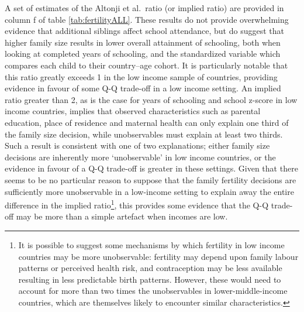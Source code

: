 \documentclass{article}[11pt,subeqn]
\begin{document}
\begin{spacing}{1.5}
A set of estimates of the Altonji et al.\ ratio (or implied ratio) are provided in column f of table \ref{tab:fertilityALL}.  These results do not provide overwhelming evidence
that additional siblings affect school attendance, but do suggest that higher family size results in lower overall attainment of schooling, both when looking at completed years 
of schooling, and the standardized variable which compares each child to their country--age cohort.  It is particularly notable that this ratio greatly exceeds 1 in the low
 income sample of countries, providing evidence in favour of some Q-Q trade-off in a low income setting.  An implied ratio greater than 2, as is the case for years of schooling 
and school z-score in low income countries, implies that observed characteristics such as parental education, place of residence and maternal health can only explain one third 
of the family size decision, while unobservables must explain at least two thirds.  Such a result is consistent with one of two explanations; either family size decisions are 
inherently more `unobservable' in low income countries, or the evidence in favour of a Q-Q trade-off is greater in these settings.  Given that there seems to be no particular 
reason to suppose that the family fertility decisions are sufficiently more unobservable in a low-income setting to explain away the entire difference in the implied ratio\footnote{It 
is possible to suggest some mechanisms by which fertility in low income countries may be more unobservable: fertility may depend upon family labour patterns or perceived 
health risk, and contraception may be less available resulting in less predictable birth patterns. However, these would need to account for more than two times the 
unobservables in lower-middle-income countries, which are themselves likely to encounter similar characteristics.}, this provides some evidence that the Q-Q trade-off may 
be more than a simple artefact when incomes are low. 



\end{spacing}
\end{document}

